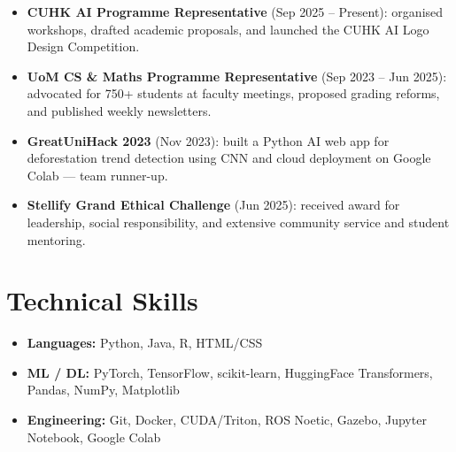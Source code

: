 \documentclass[a4paper,10pt]{article}
\begin{document}
\begin{itemize}
  \item \textbf{CUHK AI Programme Representative} (Sep 2025 -- Present): organised workshops, drafted academic proposals, and launched the CUHK AI Logo Design Competition.
  \item \textbf{UoM CS \& Maths Programme Representative} (Sep 2023 -- Jun 2025): advocated for 750+ students at faculty meetings, proposed grading reforms, and published weekly newsletters.
  \item \textbf{GreatUniHack 2023} (Nov 2023): built a Python AI web app for deforestation trend detection using CNN and cloud deployment on Google Colab --- team runner-up.
  \item \textbf{Stellify Grand Ethical Challenge} (Jun 2025): received award for leadership, social responsibility, and extensive community service and student mentoring.
\end{itemize}

\section*{Technical Skills}

\begin{itemize}
  \item \textbf{Languages:} Python, Java, R, HTML/CSS
  \item \textbf{ML / DL:} PyTorch, TensorFlow, scikit-learn, HuggingFace Transformers, Pandas, NumPy, Matplotlib
  \item \textbf{Engineering:} Git, Docker, CUDA/Triton, ROS Noetic, Gazebo, Jupyter Notebook, Google Colab
\end{itemize}
\end{document}
